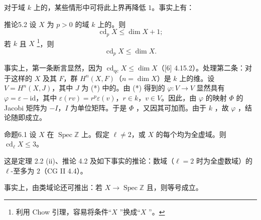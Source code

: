对于域 $k$ 上的，某些情形中可将此上界再降低 $1$。事实上有：
\begin{SGAresult}{推论}{5.2}
设 $X$ 为 $p>0$ 的域 $k$ 上的。则
\[
 \operatorname{cd}_pX\leq\dim X+1;
\]
若 $k$ 且 $X$ \footnote{利用 Chow 引理，容易将条件“$X$ ”换成“$X$ ”。}，则
\[
 \operatorname{cd}_pX\leq\dim X.
\]
\end{SGAresult}
事实上，第一条断言显然，因为 $\operatorname{cd}_{\mathrm{qc}}X\leq\dim X$（[6] 4.15.2）。处理第二条：对于这样的 $X$ 及其 $F$，群 $H^n(X,F)$（$n=\dim X$）是 $k$ 上的维。设 $V=H^n(X,J)$，其中 $J$ 为 (*) 中的。由 (*) 得到的 $\varphi:V\to V$ 显然具有 $\varphi=\varepsilon-\mathrm{id}$，其中 $\varepsilon(rv)=r^p\varepsilon(v)$，$r\in k$，$v\in V$。因此，由 $\varphi$ 的映射 $\Phi$ 的 Jacobi 矩阵为 $-I$，$I$ 为单位矩阵。于是 $\Phi$ ，又因其可加而。由于 $k$ ，故 $\varphi$ ，结论随即成立。

\begin{SGAresult}{命题}{6.1}
设 $X$ 在 $\operatorname{Spec}\mathbb Z$ 上。假定 $\ell\ne2$，或 $X$ 的每个均为全虚域。则 $\operatorname{cd}_\ell X\leq3$。
\end{SGAresult}
这是定理 2.2 (ii)、推论 4.2 及如下事实的推论：数域（$\ell=2$ 时为全虚数域）的 $\ell$-至多为 $2$（CG II 4.4）。

事实上，由类域论还可推出：若 $X\to\operatorname{Spec}\mathbb Z$ 且，则等号成立。

